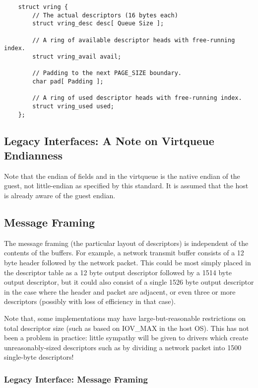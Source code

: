 \begin{lstlisting}
	struct vring {
		// The actual descriptors (16 bytes each)
		struct vring_desc desc[ Queue Size ];

		// A ring of available descriptor heads with free-running index.
		struct vring_avail avail;

		// Padding to the next PAGE_SIZE boundary.
		char pad[ Padding ];

		// A ring of used descriptor heads with free-running index.
		struct vring_used used;
	};
\end{lstlisting}

\subsection{Legacy Interfaces: A Note on Virtqueue Endianness}\label{sec:Basic Facilities of a Virtio Device / Virtqueues / Legacy Interfaces: A Note on Virtqueue Endianness}

Note that the endian of fields and in the virtqueue is the native
endian of the guest, not little-endian as specified by this standard.
It is assumed that the host is already aware of the guest endian.

\subsection{Message Framing}\label{sec:Basic Facilities of a Virtio Device / Virtqueues / Message Framing}
The message framing (the particular layout of descriptors) is
independent of the contents of the buffers. For example, a network
transmit buffer consists of a 12 byte header followed by the network
packet. This could be most simply placed in the descriptor table as a
12 byte output descriptor followed by a 1514 byte output descriptor,
but it could also consist of a single 1526 byte output descriptor in
the case where the header and packet are adjacent, or even three or
more descriptors (possibly with loss of efficiency in that case).

Note that, some implementations may have large-but-reasonable
restrictions on total descriptor size (such as based on IOV_MAX in the
host OS). This has not been a problem in practice: little sympathy
will be given to drivers which create unreasonably-sized descriptors
such as by dividing a network packet into 1500 single-byte
descriptors!

\subsubsection{Legacy Interface: Message Framing}\label{sec:Basic Facilities of a Virtio Device / Virtqueues / Message Framing / Legacy Interface: Message Framing}

